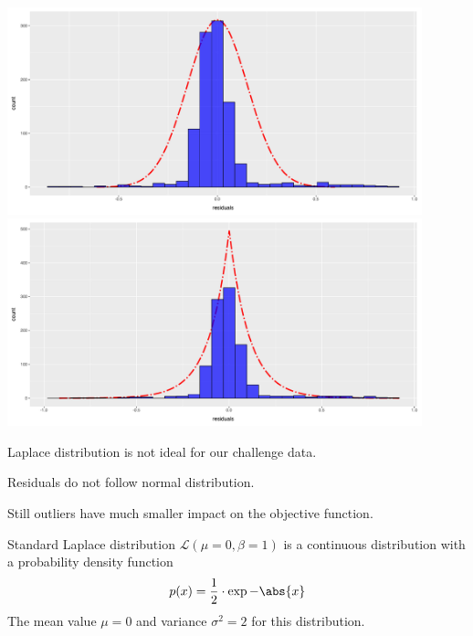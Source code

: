 \documentclass[landscape,footrule]{foils}
\begin{document}

\centerline{
\includegraphics[height=6cm]{naive_fit_residuals}\hspace*{1cm}
\includegraphics[height=6cm]{naive_fit_residuals_laplace}}

Laplace distribution is not ideal for our challenge data.

\begin{triangles}
\item Residuals do not follow normal distribution.
\item Still outliers have much smaller impact on the objective function. 
\end{triangles}




Standard Laplace distribution $\mathcal{L}(\mu=0,\beta=1)$ is a continuous distribution with a probability density function 
\begin{align*}
p(x)=\frac{1}{2}\cdot\exp{-\abs{x}}
\end{align*}
The mean value $\mu=0$ and variance $\sigma^2=2$ for this distribution.


\end{document}
